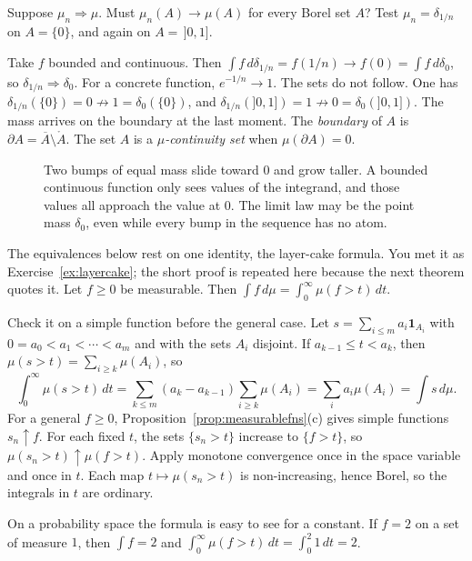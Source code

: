 \begin{think}
Suppose $\mu_n\Rightarrow\mu$. Must $\mu_n(A)\to\mu(A)$ for every Borel set $A$? Test $\mu_n=\delta_{1/n}$ on $A=\{0\}$, and again on $A=\,]0,1]$.
\end{think}

Take $f$ bounded and continuous. Then $\int f\,d\delta_{1/n}=f(1/n)\to f(0)=\int f\,d\delta_0$, so $\delta_{1/n}\Rightarrow\delta_0$. For a concrete
function, $e^{-1/n}\to 1$. The sets do not follow. One has $\delta_{1/n}(\{0\})=0\not\to 1=\delta_0(\{0\})$, and
$\delta_{1/n}(]0,1])=1\not\to 0=\delta_0(]0,1])$. The mass arrives on the boundary at the last moment. The \emph{boundary} of $A$ is
$\partial A=\overline A\setminus\mathring A$. The set $A$ is a \emph{$\mu$-continuity set} when $\mu(\partial A)=0$.

\begin{figure}[ht]
\centering
{}
\caption{Two bumps of equal mass slide toward $0$ and grow taller. A bounded continuous function only sees values of the integrand, and those
values all approach the value at $0$. The limit law may be the point mass $\delta_0$, even while every bump in the sequence has no atom.}
\label{fig:weakslide}
\end{figure}

The equivalences below rest on one identity, the layer-cake formula. You met it as Exercise~\ref{ex:layercake}; the short proof is repeated
here because the next theorem quotes it. Let $f\ge 0$ be measurable. Then $\int f\,d\mu=\int_0^\infty\mu(f>t)\,dt$.

Check it on a simple function before the general case. Let $s=\sum_{i\le m}a_i\mathbf 1_{A_i}$ with $0=a_0<a_1<\cdots<a_m$ and with the sets
$A_i$ disjoint. If $a_{k-1}\le t<a_k$, then $\mu(s>t)=\sum_{i\ge k}\mu(A_i)$, so
\[\int_0^\infty\mu(s>t)\,dt=\sum_{k\le m}(a_k-a_{k-1})\sum_{i\ge k}\mu(A_i)=\sum_ia_i\mu(A_i)=\int s\,d\mu.\]
For a general $f\ge 0$, Proposition~\ref{prop:measurablefns}(c) gives simple functions $s_n\uparrow f$. For each fixed $t$, the sets
$\{s_n>t\}$ increase to $\{f>t\}$, so $\mu(s_n>t)\uparrow\mu(f>t)$. Apply monotone convergence once in the space variable and once in $t$.
Each map $t\mapsto\mu(s_n>t)$ is non-increasing, hence Borel, so the integrals in $t$ are ordinary.

On a probability space the formula is easy to see for a constant. If $f=2$ on a set of measure $1$, then $\int f=2$ and
$\int_0^\infty\mu(f>t)\,dt=\int_0^2 1\,dt=2$.

